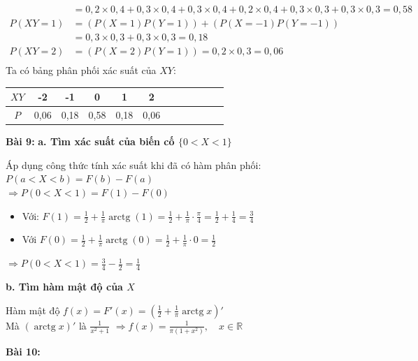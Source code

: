 \documentclass[12pt]{article}
\begin{document}
\begin{itemize}
\[\begin{aligned}
        &= 0,2 \times 0,4 + 0,3 \times 0,4 + 0,3 \times 0,4 + 0,2 \times 0,4 + 0,3 \times 0,3 + 0,3 \times 0,3 = 0,58 \\
        P(XY = 1) &= (P(X = 1)P(Y = 1)) + (P(X = -1)P(Y = -1)) \\
        &= 0,3 \times 0,3 + 0,3 \times 0,3 = 0,18\\
        P(XY =2) &= (P(X = 2)P(Y = 1)) = 0,2 \times 0,3 = 0,06 \\
    \end{aligned}
    \]
    Ta có bảng phân phối xác suất của $XY$:
    \begin{center}
        \begin{tabular}{|Sc|Sc|Sc|Sc|Sc|Sc|}
            \hline
            $XY$ & -2 & -1 & 0 & 1 & 2 \\
            \hline
            $P$ & 0,06 & 0,18 & 0,58 & 0,18 & 0,06 \\
            \hline
        \end{tabular}
    \end{center}
\end{itemize}

\clearpage

\textbf{Bài 9:}
\textbf{a. Tìm xác suất của biến cố $\{0 < X < 1\}$}

Áp dụng công thức tính xác suất khi đã có hàm phân phối:\\
$P(a < X < b) = F(b) - F(a)$ \\
$\Rightarrow P(0 < X < 1) = F(1) - F(0)$
\begin{itemize}
    \item Với:
    $F(1) = \frac{1}{2} + \frac{1}{\pi} \operatorname{arctg}(1) = \frac{1}{2} + \frac{1}{\pi} \cdot \frac{\pi}{4} = \frac{1}{2} + \frac{1}{4} = \frac{3}{4}$
    
    \item Với $F(0) = \frac{1}{2} + \frac{1}{\pi} \operatorname{arctg}(0) = \frac{1}{2} + \frac{1}{\pi} \cdot 0 = \frac{1}{2}$
\end{itemize}
$\Rightarrow P(0 < X < 1) = \frac{3}{4} - \frac{1}{2} = \frac{1}{4}$ 

\textbf{b. Tìm hàm mật độ của $X$}

Hàm mật độ $f(x) = F'(x) = \left( \frac{1}{2} + \frac{1}{\pi} \operatorname{arctg} x \right)'$ \\
Mà $(\operatorname{arctg} x)' $ là $\frac{1}{x^2 + 1}$
$\Rightarrow f(x) = \frac{1}{\pi (1 + x^2)}, \quad x \in \mathbb{R}$


\textbf{Bài 10:}
\end{document}
